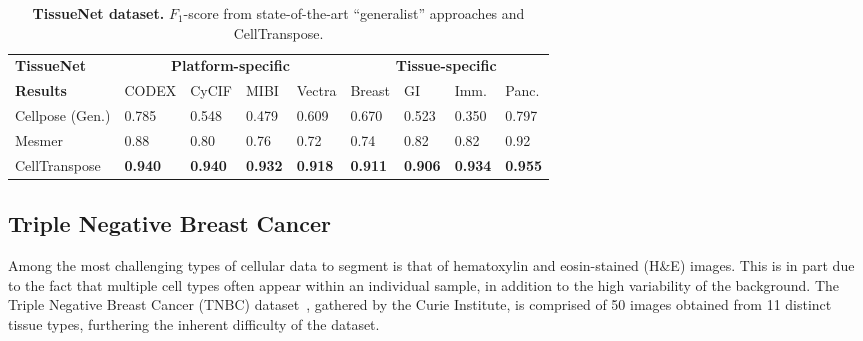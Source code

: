 \begin{table}
\begin{center}
\caption{\textbf{TissueNet dataset.} $F_1$-score from state-of-the-art ``generalist'' approaches and CellTranspose.}
\label{table:tissuenet}
\begin{adjustbox}{width=\columnwidth}
\begin{tabular}{l|llll|llll}
\hline\noalign{\smallskip}
{\bf TissueNet} & \multicolumn{4}{c|}{\textbf{Platform-specific}} & \multicolumn{4}{c}{\textbf{Tissue-specific}} \\
{\bf Results} & CODEX & CyCIF & MIBI & Vectra & Breast & GI & Imm. & Panc.\\
\noalign{\smallskip}
\hline
\noalign{\smallskip}
Cellpose (Gen.)	& 0.785	& 0.548 & 0.479 & 0.609 & 0.670 & 0.523 & 0.350 & 0.797\\
Mesmer					& 0.88 	& 0.80	& 0.76	& 0.72	& 0.74	& 0.82	& 0.82	& 0.92\\
CellTranspose           & \textbf{0.940} & \textbf{0.940} & \textbf{0.932} & \textbf{0.918} & \textbf{0.911} & \textbf{0.906} & \textbf{0.934} & \textbf{0.955}\\
\hline
\end{tabular}
\end{adjustbox}
\end{center}
\vspace{-5mm}
\end{table}



\subsection{Triple Negative Breast Cancer}
Among the most challenging types of cellular data to segment is that of hematoxylin and eosin-stained (H\&E) images. This is in part due to the fact that multiple cell types often appear within an individual sample, in addition to the high variability of the background. The Triple Negative Breast Cancer (TNBC) dataset~\cite{Naylor2019-ak}, gathered by the Curie Institute, is comprised of 50 images obtained from 11 distinct tissue types, furthering the inherent difficulty of the dataset.

